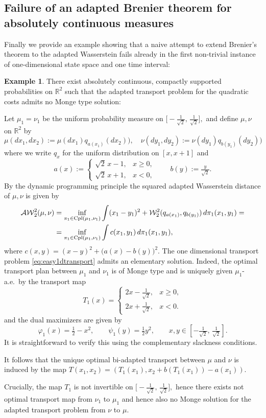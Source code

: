 \documentclass[a4paper]{amsart}
\numberwithin{theorem}{section}
\theoremstyle{definition}
\newtheorem{example}[theorem]{Example}
\newcommand{\R}{\mathbb{R}}
\newcommand{\cpl}{\textup{Cpl}}
\newcommand{\W}{\mathcal{W}}
\newcommand{\AW}{\mathcal{AW}}
\renewcommand{\phi}{\varphi}
\begin{document}
\subsection{Failure of an adapted Brenier theorem for absolutely continuous measures}
Finally we provide an example showing that a naive attempt to extend Brenier's theorem to the adapted Wasserstein  fails already in the first non-trivial instance of one-dimensional state space and one time interval: 


\begin{example}\label{ex:NoPlainAdaptedBrenier}
There exist absolutely continuous, compactly supported probabilities on $\R^2$ such that the adapted transport problem for the quadratic costs admits no Monge type solution:

\medskip


Let $\mu_1=\nu_1$ be the uniform probability measure on 
$ 
\big[-\tfrac{1}{\sqrt{2}},\,\tfrac{1}{\sqrt{2}}\big],
$ 
and define $\mu, \nu$ on $\R^2$ by
$$ \mu(dx_1,dx_2):= \mu(dx_1) q_{a(x_1)}(dx_2)), \quad \nu(dy_1,dy_2):= \nu(dy_1) q_{b(y_1)}(dy_2))$$
where we write $q_x$ for the uniform distribution on $[x,x+1]$ and  \[
a(x):=\begin{cases}
\sqrt{2}\,x-1, & x\ge 0,\\[4pt]
\sqrt{2}\,x+1, & x<0,
\end{cases}
\qquad
b(y):=\tfrac{y}{\sqrt{2}}.
\]
By the dynamic programming principle the squared adapted Wasserstein distance of $\mu, \nu$ is given by
\begin{align}
    \AW^2_2(\mu,\nu) &= \inf_{\pi_1\in \cpl(\mu_1,\nu_1)} \int (x_1-y_1)^2 + \W_2^2(q_{a(x_1)}, q_{b(y_1)}) \, d\pi_1(x_1,y_1)=\\
    &= \inf_{\pi_1\in \cpl(\mu_1,\nu_1)} \int c(x_1,y_1) \, d\pi_1(x_1,y_1),   \label{eq:easy1dtransport}
\end{align}
where \(c(x,y) = (x-y)^2+\bigl(a(x)-b(y)\bigr)^2
\). The one dimensional transport problem  \eqref{eq:easy1dtransport} admits an elementary solution. 
Indeed, 
the optimal transport plan between $\mu_1$ and $\nu_1$ is of Monge type and is uniquely given $\mu_1$-a.e.\ by the transport map
\[
T_1(x)=
\begin{cases}
2x-\tfrac{1}{\sqrt{2}}, & x\geq0,\\[4pt]
2x+\tfrac{1}{\sqrt{2}}, & x<0.
\end{cases}
\] and  the dual maximizers are given by
\[
 \phi_1(x)=\tfrac{1}{2}-x^2,\qquad 
\psi_1(y)=\tfrac{1}{2}y^2,\qquad x,y\in\left[-\tfrac{1}{\sqrt{2}},\,\tfrac{1}{\sqrt{2}}\right].
\]
It is straightforward to verify this using the complementary slackness conditions.

It follows that the unique optimal bi-adapted transport between $\mu$ and $\nu$ is induced by the map $T(x_1,x_2)=(T_1(x_1), x_2+b(T_1(x_1)) - a(x_1))$. 

Crucially, the map $T_1$ is not invertible on $ 
\big[-\tfrac{1}{\sqrt{2}},\,\tfrac{1}{\sqrt{2}}\big],
$ hence there exists not optimal transport map from $\nu_1$ to $\mu_1$ and hence also no Monge solution for the adapted transport problem from $\nu$ to $\mu$.
\end{example}
\end{document}
